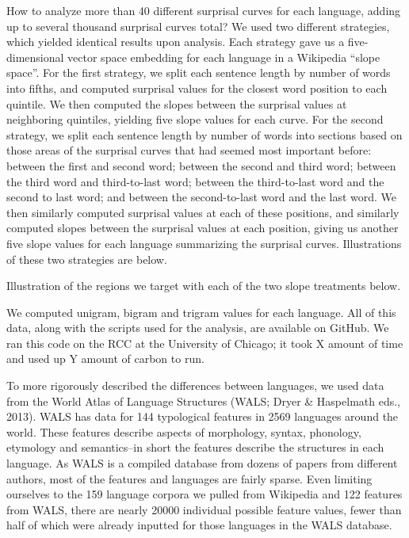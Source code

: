 \documentclass[11pt,]{article}
\begin{document}
How to analyze more than 40 different surprisal curves for each language, adding up to several thousand surprisal curves total? We used two different strategies, which yielded identical results upon analysis. Each strategy gave us a five-dimensional vector space embedding for each language in a Wikipedia ``slope space''. For the first strategy, we split each sentence length by number of words into fifths, and computed surprisal values for the closest word position to each quintile. We then computed the slopes between the surprisal values at neighboring quintiles, yielding five slope values for each curve. For the second strategy, we split each sentence length by number of words into sections based on those areas of the surprisal curves that had seemed most important before: between the first and second word; between the second and third word; between the third word and third-to-last word; between the third-to-last word and the second to last word; and between the second-to-last word and the last word. We then similarly computed surprisal values at each of these positions, and similarly computed slopes between the surprisal values at each position, giving us another five slope values for each language summarizing the surprisal curves. Illustrations of these two strategies are below.

Illustration of the regions we target with each of the two slope treatments below.

We computed unigram, bigram and trigram values for each language. All of this data, along with the scripts used for the analysis, are available on GitHub. We ran this code on the RCC at the University of Chicago; it took X amount of time and used up Y amount of carbon to run.

To more rigorously described the differences between languages, we used data from the World Atlas of Language Structures (WALS; Dryer \& Haspelmath eds., 2013). WALS has data for 144 typological features in 2569 languages around the world. These features describe aspects of morphology, syntax, phonology, etymology and semantics--in short the features describe the structures in each language. As WALS is a compiled database from dozens of papers from different authors, most of the features and languages are fairly sparse. Even limiting ourselves to the 159 language corpora we pulled from Wikipedia and 122 features from WALS, there are nearly 20000 individual possible feature values, fewer than half of which were already inputted for those languages in the WALS database.
\end{document}
